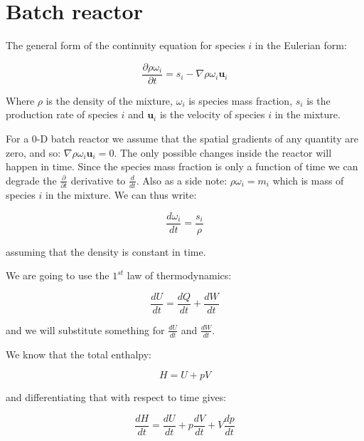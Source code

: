 \documentclass[10pt]{article}
\begin{document}
\newpage

\section{Batch reactor}

The general form of the continuity equation for species $i$ in the Eulerian form:

\begin{equation} \label{eq:species-mass-conservation}
\frac{\partial \rho \omega_i}{\partial t} = s_i - \nabla \rho \omega_i \mathbf{u}_{i}
\end{equation}

Where $\rho$ is the density of the mixture, $\omega_i$ is species mass fraction, $s_i$ is the production rate of species $i$ and $\mathbf{u}_i$ is the velocity of species $i$ in the mixture.

For a 0-D batch reactor we assume that the spatial gradients of any quantity are zero, and so: $ \nabla \rho \omega_i \mathbf{u}_{i} = 0$. The only possible changes inside the reactor will happen in time. Since the species mass fraction is only a function of time we can degrade the $\frac{\partial}{\partial t}$ derivative to $\frac{d}{dt}$. Also as a side note: $\rho \omega_i = m_i$ which is mass of species $i$ in the mixture. We can thus write:

\begin{equation} \label{eq:batch-reactor-species-mass}
\frac{d \omega_i}{dt} = \frac{s_i}{\rho}
\end{equation}

assuming that the density is constant in time.

We are going to use the $1^{st}$ law of thermodynamics:

\begin{equation}
\frac{dU}{dt} = \frac{dQ}{dt} + \frac{dW}{dt}
\end{equation}

and we will substitute something for $\frac{dU}{dt}$ and $\frac{dW}{dt}$.

We know that the total enthalpy:

\begin{equation}
H = U + p V
\end{equation}

and differentiating that with respect to time gives:

\begin{equation} \label{eq:enthalpy}
\frac{d H}{dt} = \frac{dU}{dt} + p \frac{dV}{dt} + V \frac{dp}{dt}
\end{equation}
\end{document}
